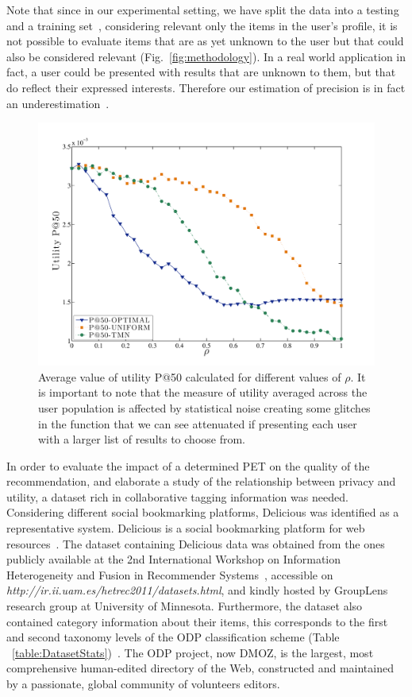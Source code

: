 Note that since in our experimental setting, we have split the data into a testing and a training set~\cite{a02,a03}, considering relevant only the items in the user's profile, it is not possible to evaluate items that are as yet unknown to the user but that could also be considered relevant (Fig.~\ref{fig:methodology}).  In a real world application in fact, a user could be presented with results that are unknown to them, but that do reflect their expressed interests. Therefore our estimation of precision is in fact an underestimation~\cite{a23}.

\begin{figure}[htb]  
\includegraphics[width=\textwidth]{figures/Fig5b.pdf}
\caption[Utility measurement P@50.]{Average value of utility P@50 calculated for different values of $\rho$. It is important to note that the measure of utility averaged across the user population is affected by statistical noise creating some glitches in the function that we can see attenuated if presenting each user with a larger list of results to choose from.}
\label{fig:P50-Rho}
\end{figure}

In order to evaluate the impact of a determined PET on the quality of the recommendation, and elaborate a study of the relationship between privacy and utility, a dataset rich in collaborative tagging information was needed.  Considering different social bookmarking platforms, Delicious was identified as a representative system. Delicious is a social bookmarking platform for web resources~\cite{delicious}. The dataset containing Delicious data was obtained from the ones publicly available at the 2nd International Workshop on Information Heterogeneity and Fusion in Recommender Systems~\cite{a21}, accessible on \emph{http://ir.ii.uam.es/hetrec2011/datasets.html}, and kindly hosted by  GroupLens research group at University of Minnesota. Furthermore, the dataset also contained category information about their items, this corresponds to the first and second taxonomy levels of the ODP classification scheme (Table ~\ref{table:DatasetStats})~\cite{a22}. The ODP project, now DMOZ, is the largest, most comprehensive human-edited directory of the Web, constructed and maintained by a passionate, global community of volunteers editors.

